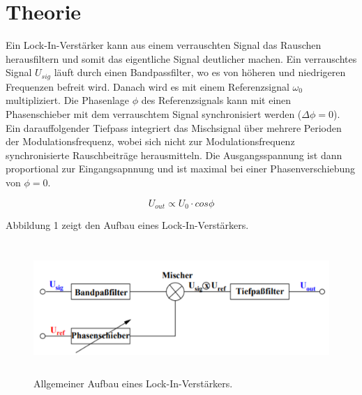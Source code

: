\section{Theorie}
\label{sec:Theorie}

Ein Lock-In-Verstärker kann aus einem verrauschten Signal das Rauschen herausfiltern und somit
das eigentliche Signal deutlicher machen. Ein verrauschtes Signal $U_{sig}$ läuft durch einen Bandpassfilter, wo es
von höheren und niedrigeren Frequenzen befreit wird. Danach wird es mit einem Referenzsignal $\omega_0$
multipliziert. Die Phasenlage $\phi$ des Referenzsignals kann mit einen Phasenschieber mit dem
verrauschtem Signal synchronisiert werden ($\Delta \phi = 0$). Ein darauffolgender Tiefpass integriert das Mischsignal
über mehrere Perioden der Modulationsfrequenz, wobei sich nicht zur Modulationsfrequenz synchronisierte Rauschbeiträge herausmitteln.
Die Ausgangsspannung ist dann proportional zur Eingangsapnnung und ist maximal bei einer Phasenverschiebung von $\phi = 0$.

\begin{equation}
  U_{out} \propto U_0 \cdot cos{\phi}
\end{equation}


Abbildung 1 zeigt den Aufbau eines Lock-In-Verstärkers.

\begin{figure}[H]
  \centering
  \includegraphics[height=5cm]{Lock.PNG}
  \caption{Allgemeiner Aufbau eines Lock-In-Verstärkers. \cite{sample}}
  \label{fig:Lock}
\end{figure}
